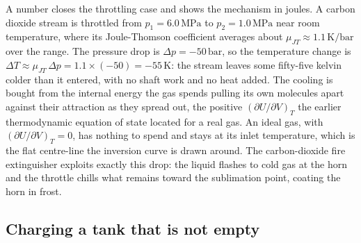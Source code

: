 A number closes the throttling case and shows the mechanism in joules. A carbon
dioxide stream is throttled from $p_1 = 6.0\,\text{MPa}$ to $p_2 =
1.0\,\text{MPa}$ near room temperature, where its Joule-Thomson coefficient
averages about $\mu_{JT} \approx 1.1\,\si{\kelvin}/\text{bar}$ over the range. The
pressure drop is $\Delta p = -50\,\text{bar}$, so the temperature change is
$\Delta T \approx \mu_{JT}\,\Delta p = 1.1 \times (-50) = -55\,\si{\kelvin}$: the
stream leaves some fifty-five kelvin colder than it entered, with no shaft work and
no heat added. The cooling is bought from the internal energy the gas spends
pulling its own molecules apart against their attraction as they spread out, the
positive $(\partial U/\partial V)_T$ the earlier thermodynamic equation of state
located for a real gas. An ideal gas, with $(\partial U/\partial V)_T = 0$, has
nothing to spend and stays at its inlet temperature, which is the flat centre-line
the inversion curve is drawn around. The carbon-dioxide fire extinguisher exploits
exactly this drop: the liquid flashes to cold gas at the horn and the throttle
chills what remains toward the sublimation point, coating the horn in frost.

\subsection{Charging a tank that is not empty}

